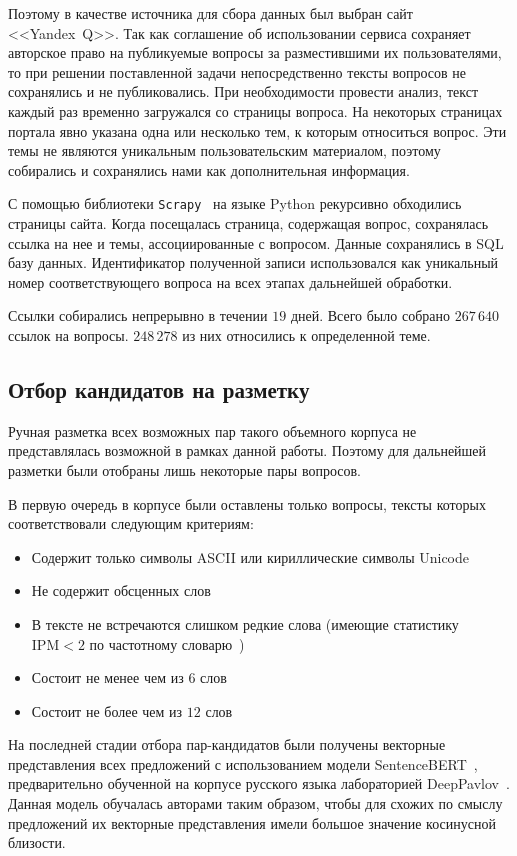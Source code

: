 \documentclass[a4paper,14pt]{extarticle}
\begin{document}
Поэтому в качестве источника для сбора данных был выбран сайт \mbox{<<Yandex Q>>}.
Так как соглашение об использовании сервиса сохраняет авторское право на публикуемые вопросы за разместившими их пользователями, то при решении поставленной задачи непосредственно тексты вопросов не сохранялись и не публиковались.
При необходимости провести анализ, текст каждый раз временно загружался со страницы вопроса.
На некоторых страницах портала явно указана одна или несколько тем, к которым относиться вопрос.
Эти темы не являются уникальным пользовательским материалом, поэтому собирались и сохранялись нами как дополнительная информация.

С помощью библиотеки \texttt{Scrapy}~\autocite{scrapy_docs} на языке \mbox{Python} рекурсивно обходились страницы сайта.
Когда посещалась страница, содержащая вопрос, сохранялась ссылка на нее и темы, ассоциированные с вопросом.
Данные сохранялись в \mbox{SQL} базу данных.
Идентификатор полученной записи использовался как уникальный номер соответствующего вопроса на всех этапах дальнейшей обработки.

Ссылки собирались непрерывно в течении $19$ дней.
Всего было собрано $267\,640$ ссылок на вопросы.
$248\,278$ из них относились к определенной теме.

\subsection{Отбор кандидатов на разметку}
Ручная разметка всех возможных пар такого объемного корпуса не представлялась возможной в рамках данной работы.
Поэтому для дальнейшей разметки были отобраны лишь некоторые пары вопросов.

В первую очередь в корпусе были оставлены только вопросы, тексты которых соответствовали следующим критериям:
\begin{itemize}
    \item Содержит только символы \mbox{ASCII} или кириллические символы \mbox{Unicode}
    \item Не содержит обсценных слов
    \item В тексте не встречаются слишком редкие слова (имеющие статистику ${\mathrm{IPM} < 2}$ по частотному словарю~\autocite{ляшевская2009частотный})
    \item Состоит не менее чем из $6$ слов
    \item Состоит не более чем из $12$ слов
\end{itemize}

На последней стадии отбора пар-кандидатов были получены векторные представления всех предложений с использованием модели \mbox{SentenceBERT}~\autocite{reimers2019sentence}, предварительно обученной на корпусе русского языка лабораторией \mbox{DeepPavlov}~\autocite{deeppavlov_sbert}.
Данная модель обучалась авторами таким образом, чтобы для схожих по смыслу предложений их векторные представления имели большое значение косинусной близости.
\end{document}
